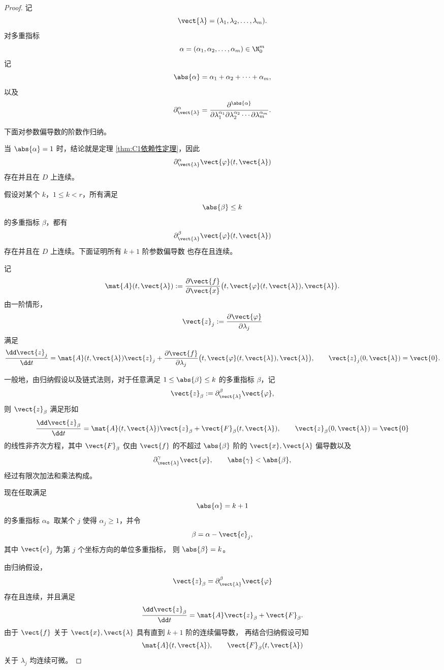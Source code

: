 \begin{proof}
	记
	\[
	\vect{\lambda}
	=
	(\lambda_1,\lambda_2,\ldots,\lambda_m).
	\]
	对多重指标
	\[
	\alpha=(\alpha_1,\alpha_2,\ldots,\alpha_m)\in\N_0^m
	\]
	记
	\[
	\abs{\alpha}
	=
	\alpha_1+\alpha_2+\cdots+\alpha_m,
	\]
	以及
	\[
	\partial_{\vect{\lambda}}^\alpha
	=
	\frac{
		\partial^{\abs{\alpha}}
	}{
		\partial\lambda_1^{\alpha_1}
		\partial\lambda_2^{\alpha_2}
		\cdots
		\partial\lambda_m^{\alpha_m}
	}.
	\]
	
	下面对参数偏导数的阶数作归纳。
	
	当 $\abs{\alpha}=1$ 时，结论就是定理
	\ref{thm:C1依赖性定理}，因此
	\[
	\partial_{\vect{\lambda}}^\alpha
	\vect{\varphi}(t,\vect{\lambda})
	\]
	存在并且在 $D$ 上连续。
	
	假设对某个 $k$，$1\leq k<r$，所有满足
	\[
	\abs{\beta}\leq k
	\]
	的多重指标 $\beta$，都有
	\[
	\partial_{\vect{\lambda}}^\beta
	\vect{\varphi}(t,\vect{\lambda})
	\]
	存在并且在 $D$ 上连续。下面证明所有 $k+1$ 阶参数偏导数
	也存在且连续。
	
	记
	\[
	\mat{A}(t,\vect{\lambda})
	\mathrel{:=}
	\frac{\partial\vect{f}}{\partial\vect{x}}
	\bigl(
	t,\vect{\varphi}(t,\vect{\lambda}),\vect{\lambda}
	\bigr).
	\]
	由一阶情形，
	\[
	\vect{z}_j
	\mathrel{:=}
	\frac{\partial\vect{\varphi}}{\partial\lambda_j}
	\]
	满足
	\[
	\frac{\dd\vect{z}_j}{\dd t}
	=
	\mat{A}(t,\vect{\lambda})\vect{z}_j
	+
	\frac{\partial\vect{f}}{\partial\lambda_j}
	\bigl(
	t,\vect{\varphi}(t,\vect{\lambda}),\vect{\lambda}
	\bigr),
	\qquad
	\vect{z}_j(0,\vect{\lambda})=\vect{0}.
	\]
	
	一般地，由归纳假设以及链式法则，对于任意满足
	$1\leq\abs{\beta}\leq k$ 的多重指标 $\beta$，记
	\[
	\vect{z}_{\beta}
	\mathrel{:=}
	\partial_{\vect{\lambda}}^\beta
	\vect{\varphi},
	\]
	则 $\vect{z}_{\beta}$ 满足形如
	\[
	\frac{\dd\vect{z}_{\beta}}{\dd t}
	=
	\mat{A}(t,\vect{\lambda})\vect{z}_{\beta}
	+
	\vect{F}_{\beta}(t,\vect{\lambda}),
	\qquad
	\vect{z}_{\beta}(0,\vect{\lambda})=\vect{0}
	\]
	的线性非齐次方程，其中
	$\vect{F}_{\beta}$ 仅由
	$\vect{f}$ 的不超过 $\abs{\beta}$ 阶的
	$\vect{x},\vect{\lambda}$ 偏导数以及
	\[
	\partial_{\vect{\lambda}}^\gamma
	\vect{\varphi},
	\qquad
	\abs{\gamma}<\abs{\beta},
	\]
	经过有限次加法和乘法构成。
	
	现在任取满足
	\[
	\abs{\alpha}=k+1
	\]
	的多重指标 $\alpha$。取某个 $j$ 使得
	$\alpha_j\geq1$，并令
	\[
	\beta=\alpha-\vect{e}_j,
	\]
	其中 $\vect{e}_j$ 为第 $j$ 个坐标方向的单位多重指标，
	则 $\abs{\beta}=k$。
	
	由归纳假设，
	\[
	\vect{z}_{\beta}
	=
	\partial_{\vect{\lambda}}^\beta
	\vect{\varphi}
	\]
	存在且连续，并且满足
	\[
	\frac{\dd\vect{z}_{\beta}}{\dd t}
	=
	\mat{A}\vect{z}_{\beta}
	+
	\vect{F}_{\beta}.
	\]
	由于 $\vect{f}$ 关于
	$\vect{x},\vect{\lambda}$ 具有直到 $k+1$ 阶的连续偏导数，
	再结合归纳假设可知
	\[
	\mat{A}(t,\vect{\lambda}),
	\qquad
	\vect{F}_{\beta}(t,\vect{\lambda})
	\]
	关于 $\lambda_j$ 均连续可微。
	

\end{proof}
